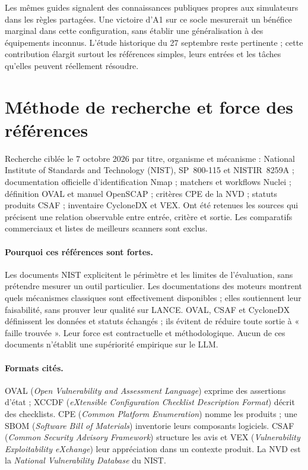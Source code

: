 \documentclass[11pt,a4paper]{article}
\begin{document}
Les mêmes guides signalent des connaissances publiques propres aux simulateurs dans les règles partagées. Une victoire d'A1 sur ce socle mesurerait un bénéfice marginal dans cette configuration, sans établir une généralisation à des équipements inconnus. L'étude historique du 27 septembre reste pertinente ; cette contribution élargit surtout les références simples, leurs entrées et les tâches qu'elles peuvent réellement résoudre.

\section{Méthode de recherche et force des références}
Recherche ciblée le 7 octobre 2026 par titre, organisme et mécanisme : National Institute of Standards and Technology (NIST), SP~800-115 et NISTIR~8259A ; documentation officielle d'identification Nmap ; matchers et workflows Nuclei ; définition OVAL et manuel OpenSCAP ; critères CPE de la NVD ; statuts produits CSAF ; inventaire CycloneDX et VEX. Ont été retenues les sources qui précisent une relation observable entre entrée, critère et sortie. Les comparatifs commerciaux et listes de meilleurs scanners sont exclus.

\paragraph{Pourquoi ces références sont fortes.}
Les documents NIST explicitent le périmètre et les limites de l'évaluation, sans prétendre mesurer un outil particulier. Les documentations des moteurs montrent quels mécanismes classiques sont effectivement disponibles ; elles soutiennent leur faisabilité, sans prouver leur qualité sur LANCE. OVAL, CSAF et CycloneDX définissent les données et statuts échangés ; ils évitent de réduire toute sortie à « faille trouvée ». Leur force est contractuelle et méthodologique. Aucun de ces documents n'établit une supériorité empirique sur le LLM.

\paragraph{Formats cités.}
OVAL (\emph{Open Vulnerability and Assessment Language}) exprime des assertions d'état ; XCCDF (\emph{eXtensible Configuration Checklist Description Format}) décrit des checklists. CPE (\emph{Common Platform Enumeration}) nomme les produits ; une SBOM (\emph{Software Bill of Materials}) inventorie leurs composants logiciels. CSAF (\emph{Common Security Advisory Framework}) structure les avis et VEX (\emph{Vulnerability Exploitability eXchange}) leur appréciation dans un contexte produit. La NVD est la \emph{National Vulnerability Database} du NIST.
\end{document}
